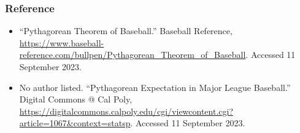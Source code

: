 \documentclass[
]{article}
\providecommand{\tightlist}{%
  \setlength{\itemsep}{0pt}\setlength{\parskip}{0pt}}
\begin{document}
\hypertarget{reference}{%
\subsubsection{Reference}\label{reference}}

\begin{itemize}
\tightlist
\item
  ``Pythagorean Theorem of Baseball.'' Baseball Reference,
  \url{https://www.baseball-reference.com/bullpen/Pythagorean_Theorem_of_Baseball}.
  Accessed 11 September 2023.
\item
  No author listed. ``Pythagorean Expectation in Major League
  Baseball.'' Digital Commons @ Cal Poly,
  \url{https://digitalcommons.calpoly.edu/cgi/viewcontent.cgi?article=1067\&context=statsp}.
  Accessed 11 September 2023.
\end{itemize}
\end{document}
